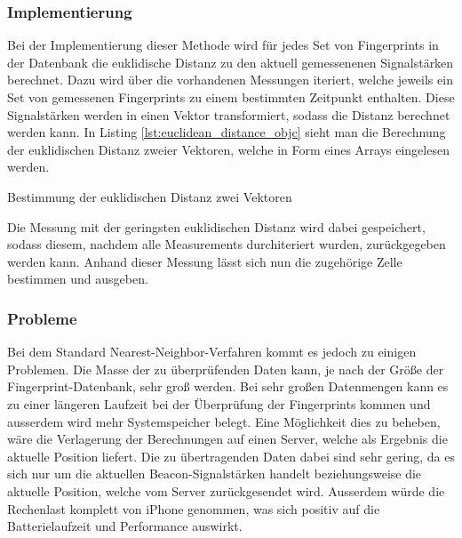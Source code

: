 \subsubsection{Implementierung}
\label{sec:implementation:fingerprinting:positioning:naiv:implementation}
Bei der Implementierung dieser Methode wird für jedes Set von Fingerprints in der Datenbank die euklidische Distanz zu den aktuell gemessenenen Signalstärken berechnet. Dazu wird über die vorhandenen Messungen iteriert, welche jeweils ein Set von gemessenen Fingerprints zu einem bestimmten Zeitpunkt enthalten. Diese Signalstärken werden in einen Vektor transformiert, sodass die Distanz berechnet werden kann. In Listing \ref{lst:euclidean_distance_objc} sieht man die Berechnung der euklidischen Distanz zweier Vektoren, welche in Form eines Arrays eingelesen werden.

\begin{listing}[htb!]
    \caption{Bestimmung der euklidischen Distanz zwei Vektoren}
	\label{lst:euclidean_distance_objc}
\end{listing}

Die Messung mit der geringsten euklidischen Distanz wird dabei gespeichert, sodass diesem, nachdem alle Measurements durchiteriert wurden, zurückgegeben werden kann. Anhand dieser Messung lässt sich nun die zugehörige Zelle bestimmen und ausgeben.

\subsubsection{Probleme}
\label{sec:implementation:fingerprinting:positioning:naiv:problems}
Bei dem Standard Nearest-Neighbor-Verfahren kommt es jedoch zu einigen Problemen. 
Die Masse der zu überprüfenden Daten kann, je nach der Größe der Fingerprint-Datenbank, sehr groß werden. Bei sehr großen Datenmengen kann es zu einer längeren Laufzeit bei der Überprüfung der Fingerprints kommen und ausserdem wird mehr Systemspeicher belegt. 
Eine Möglichkeit dies zu beheben, wäre die Verlagerung der Berechnungen auf einen Server, welche als Ergebnis die aktuelle Position liefert. Die zu übertragenden Daten dabei sind sehr gering, da es sich nur um die aktuellen Beacon-Signalstärken handelt beziehungsweise die aktuelle Position, welche vom Server zurückgesendet wird. 
Ausserdem würde die Rechenlast komplett von iPhone genommen, was sich positiv auf die Batterielaufzeit und Performance auswirkt.

